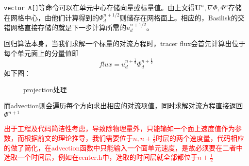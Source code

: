 \documentclass[lang=cn,11pt,a4paper]{elegantpaper}
\begin{document}
\texttt{vector A[]}等命令可以在单元中心存储向量或标量值。由上文得$ \mathbf{U}^n, \nabla \Phi, \Phi^n$存储在网格中心，由他们计算得到的$\Phi^{n+1/2}_d$则储存在网格面上。相应的，Basilisk的交错网格直接存储的就是下一步计算所需的$u_d^{n+1/2}$。\par
回归算法本身，当我们求解一个标量的对流方程时，tracer flux会首先计算出位于每个单元面上的分量值即
\begin{equation}
    flux = u^{n+ \frac{1}{2}}_d \Phi^{n+ \frac{1}{2}}_d
\end{equation}
如下图：
\begin{figure}[H]
    \centering
    \begin{center}
    \end{center}
    \caption{projection处理}
\end{figure}
而advection则会遍历每个方向求出相应的对流项值，同时求解对流方程直接返回$\Phi^{n+1}$\par
\textcolor{red}{出于工程及代码简洁性考虑，导致除物理量外，只能输如一个面上速度值作为参数，而根据前文的理论推导，我们需要位于$n,n+ \frac{1}{2}$时层的两个速度量，代码相应的做了简化，在advection函数中只能输入一个面单元速度，是故必须要在二者中选取一个时间层，例如在center.h中，选取的时间层就全部都位于$n+\frac{1}{2}$}
\end{document}
